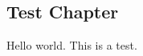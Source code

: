 \documentclass[phd, zdraft]{iitmdissertation}
\begin{document}
\begin{MainMatter}
\chapter{Test Chapter}
Hello world. This is a test.
\end{MainMatter}
\begin{BackMatter}
\end{BackMatter}
\end{document}
